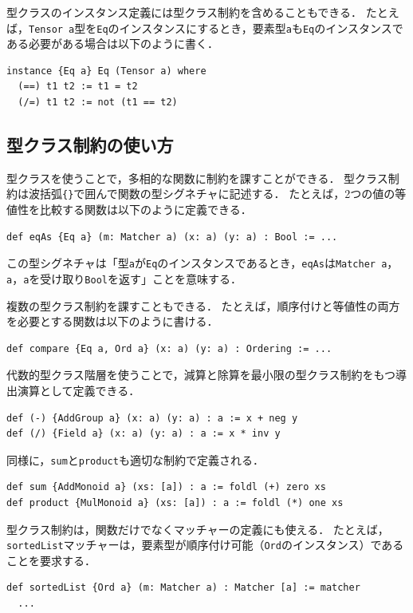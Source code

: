 型クラスのインスタンス定義には型クラス制約を含めることもできる．
たとえば，\lstinline{Tensor a}型を\lstinline{Eq}のインスタンスにするとき，要素型\lstinline{a}も\lstinline{Eq}のインスタンスである必要がある場合は以下のように書く．
\begin{lstlisting}[language=egison,numbers=none]
instance {Eq a} Eq (Tensor a) where
  (==) t1 t2 := t1 = t2
  (/=) t1 t2 := not (t1 == t2)
\end{lstlisting}

\subsection{型クラス制約の使い方}

型クラスを使うことで，多相的な関数に制約を課すことができる．
型クラス制約は波括弧\lstinline|{}|で囲んで関数の型シグネチャに記述する．
たとえば，2つの値の等値性を比較する関数は以下のように定義できる．
\begin{lstlisting}[language=egison,numbers=none]
def eqAs {Eq a} (m: Matcher a) (x: a) (y: a) : Bool := ...
\end{lstlisting}
この型シグネチャは「型\lstinline{a}が\lstinline{Eq}のインスタンスであるとき，\lstinline{eqAs}は\lstinline{Matcher a}，\lstinline{a}，\lstinline{a}を受け取り\lstinline{Bool}を返す」ことを意味する．

複数の型クラス制約を課すこともできる．
たとえば，順序付けと等値性の両方を必要とする関数は以下のように書ける．
\begin{lstlisting}[language=egison,numbers=none]
def compare {Eq a, Ord a} (x: a) (y: a) : Ordering := ...
\end{lstlisting}

代数的型クラス階層を使うことで，減算と除算を最小限の型クラス制約をもつ導出演算として定義できる．
\begin{lstlisting}[language=egison,numbers=none]
def (-) {AddGroup a} (x: a) (y: a) : a := x + neg y
def (/) {Field a} (x: a) (y: a) : a := x * inv y
\end{lstlisting}
同様に，\lstinline{sum}と\lstinline{product}も適切な制約で定義される．
\begin{lstlisting}[language=egison,numbers=none]
def sum {AddMonoid a} (xs: [a]) : a := foldl (+) zero xs
def product {MulMonoid a} (xs: [a]) : a := foldl (*) one xs
\end{lstlisting}

型クラス制約は，関数だけでなくマッチャーの定義にも使える．
たとえば，\lstinline{sortedList}マッチャーは，要素型が順序付け可能（\lstinline{Ord}のインスタンス）であることを要求する．
\begin{lstlisting}[language=egison,numbers=none]
def sortedList {Ord a} (m: Matcher a) : Matcher [a] := matcher
  ...
\end{lstlisting}

